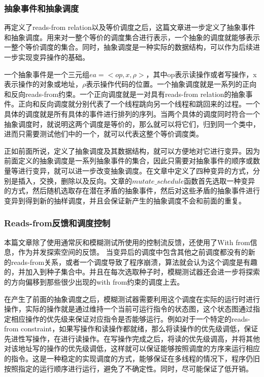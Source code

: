 \subsubsection{抽象事件和抽象调度}

再定义了reads-from relation以及等价调度之后，这篇文章进一步定义了抽象事件和抽象调度。用来对一整个等价的调度集合进行表示，一个抽象的调度就能够表示一整个等价调度的集合。同时，抽象调度是一种实际的数据结构，可以作为后续进一步实现变异操作的基础。

一个抽象事件是一个三元组$ea=<op, x, \rho>$，其中op表示读操作或者写操作，x表示操作的对象或地址，$\rho$表示操作代码的位置。一个抽象调度就是一系列的正向和反向reads-from约束。一个正向调度就是一对具有reads-from relation的抽象事件。正向和反向调度就分别代表了一个线程跳向另一个线程和跳回来的过程。一个具体的调度就是所有具体的事件进行排列的序列。当两个具体的调度同时符合一个抽象调度时，就说明这两个调度是等价的，那么就可以将它们，归到同一个类中，进而只需要测试他们中的一个，就可以代表这整个等价调度类。

正如前面所说，定义了抽象调度及其数据结构，就可以方便地对它进行变异。因为前面定义的抽象调度是一系列抽象事件的集合，因此只需要对抽象事件的顺序或数量等进行变异，就可以进一步改变抽象调度。在文章中定义了四种变异的方式，分别是插入，交换，删除以及反向。文章的$mutate\_schedule$函数首先选取一种变异的方式，然后随机选取存在潜在矛盾的抽象事件，然后对这些矛盾的抽象事件进行变异到得到新的抽样调度，并且会保证新产生的抽象调度不会和前面的重复。

\subsubsection{Reads-from反馈和调度控制}

本篇文章除了使用通常灰和模糊测试所使用的控制流反馈，还使用了With from信息，作为并发探索空间的反馈。 当变异后的调度中包含其他之前调度都没有的新的reads-from关系，或者一个调度导致了程序崩溃，算法就会认为这个调度是有趣的，并加入到种子集合中。并且在每次选取种子时，模糊测试器还会进一步将探索的方向偏移到那些很少出现的with from约束的调度上去。

在产生了前面的抽象调度之后，模糊测试器需要利用这个调度在实际的运行时进行操作，实际的操作就是通过维持一个当前可运行指令的状态图，这个状态图通过指定相应操作的优先级来保证对应指令是否能够运行。例如对于一个特定的reads-from constraint，如果写操作和读操作都就绪，那么将读操作的优先级调低，保证先进性写操作，在进行读操作。在写操作完成之后，将读的优先级调高，并将其他对该地址写的操作的优先级调低，这样就可以保证能够按照调度的方序来运行相应的指令。这是一种稳定的实现调度的方式，能够保证在多线程的情况下，程序仍旧按照指定的运行顺序进行运行，避免了不确定性。同时，尽可能保证了低开销。


